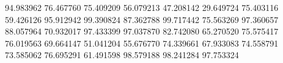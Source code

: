 94.983962
76.467760
75.409209
56.079213
47.208142
29.649724
75.403116
59.426126
95.912942
99.390824
87.362788
99.717442
75.563269
97.360657
88.057964
70.932017
97.433399
97.037870
82.742080
65.270520
75.575417
76.019563
69.664147
51.041204
55.676770
74.339661
67.933083
74.558791
73.585062
76.695291
61.491598
98.579188
98.241284
97.753324
